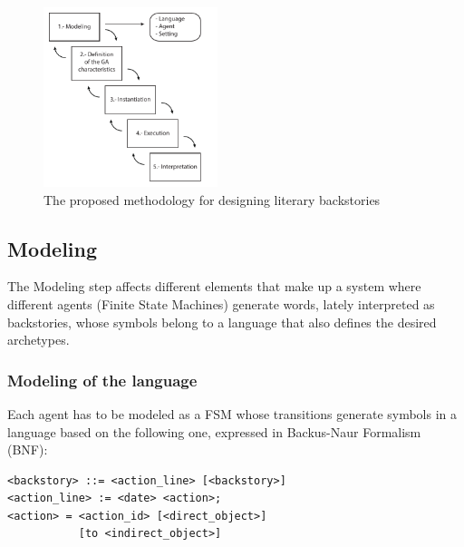 \documentclass{sig-alternate}
\begin{document}
\begin{figure}[htb]
\centering
   \includegraphics[width=12pc] {img/methodology.pdf}
\caption{The proposed methodology for designing literary backstories}
\label{fig:methodology}
\end{figure}


\subsection{Modeling}

The Modeling step affects different elements that make up a system where different agents (Finite State Machines) generate words, lately interpreted as backstories, whose symbols belong to a language that also defines the desired archetypes.


\subsubsection{Modeling of the language}

Each agent has to be modeled as a FSM whose transitions generate symbols in a language based on the following one, expressed in Backus-Naur Formalism (BNF):

\begin{verbatim}
<backstory> ::= <action_line> [<backstory>]
<action_line> := <date> <action>;
<action> = <action_id> [<direct_object>]
           [to <indirect_object>]
\end{verbatim}
\end{document}
